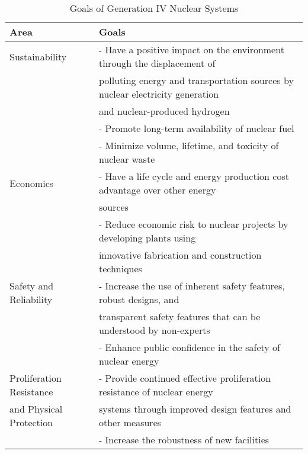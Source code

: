 \begin{table}[]
    \centering
    \onehalfspacing
    \caption{Goals of Generation IV Nuclear Systems \cite{gif_technology_2002,
    behar_technology_2014}}
	\label{tab:goals-gen4}
    \small
    \begin{tabular}{l|l}
    \hline
                               \textbf{Area} & \textbf{Goals} \\ \hline
    Sustainability   & - Have a positive impact on the environment through the displacement of \\
    & polluting energy and transportation sources by nuclear electricity generation \\
    & and nuclear-produced hydrogen \\ 
    & - Promote long-term availability of nuclear fuel \\
    & - Minimize volume, lifetime, and toxicity of nuclear waste \\ \hline
    Economics & - Have a life cycle and energy production cost advantage over other energy \\
    & sources \\ 
    & - Reduce economic risk to nuclear projects by developing plants using \\
    & innovative fabrication and construction techniques \\ \hline
    Safety and Reliability   & - Increase the use of inherent safety features, robust designs, and \\
    & transparent safety features that can be understood by non-experts \\ 
    & - Enhance public confidence in the safety of nuclear energy \\\hline
    Proliferation Resistance & - Provide continued effective proliferation resistance of nuclear energy \\
    and Physical Protection & systems through improved design features and other measures \\ 
    & - Increase the robustness of new facilities \\ \hline
    \end{tabular}
    \end{table}

